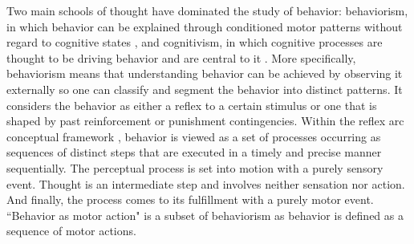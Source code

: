\documentclass[a4paper, 11pt]{article}
\begin{document}


Two main schools of thought have dominated the study of behavior: behaviorism, in which behavior can be explained through conditioned motor patterns without regard to cognitive states \cite{skinner1986behaviorism, skinner2011behaviorism}, and cognitivism, in which cognitive processes are thought to be driving behavior and are central to it \cite{haugeland1978nature}. More specifically, behaviorism \cite{skinner1986behaviorism, skinner2011behaviorism} means that understanding behavior can be achieved by observing it externally so one can classify and segment the behavior into distinct patterns. It considers the behavior as either a reflex to a certain stimulus  \cite{dewey1896reflex} or one that is shaped by past reinforcement or punishment contingencies. Within the reflex arc conceptual framework \cite{dewey1896reflex}, behavior is viewed as a set of processes occurring as sequences of distinct steps that are executed in a timely and precise manner sequentially. The perceptual process is set into motion with a purely sensory event. Thought is an intermediate step and involves neither sensation nor action. And finally, the process comes to its fulfillment with a purely motor event. ``Behavior as motor action" is a subset of behaviorism as behavior is defined as a sequence of motor actions. 
\end{document}
